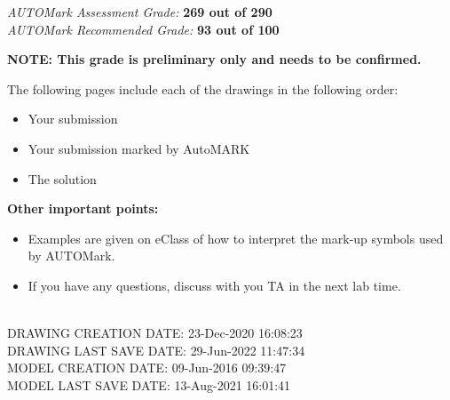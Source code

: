 \documentclass{article}
\begin{document}
\begin{center}
 \large \emph {{AUTOMark Assessment Grade:}}
 \large \textbf{269 out of 290}\\[0.5 cm] %
 \large \emph {{AUTOMark Recommended Grade:}}
 \large \textbf{93 out of 100}\\[0.5 cm] %
\end{center}
\vspace{1.0\baselineskip} %
\begin{flushleft}
\textbf{NOTE: This grade is preliminary only and needs to be confirmed.}\\[1.0 cm] %
\end{flushleft}
The following pages include each of the drawings in the following order:
\begin{itemize}
\itemsep0em %
	\item Your submission 
	\item Your submission marked by AutoMARK
	\item The solution
\end{itemize}
%
\textbf{Other important points:}
\begin{itemize}
\itemsep0em %
	\item Examples are given on eClass of how to interpret the mark-up symbols used by AUTOMark.
	\item If you have any questions, discuss with you TA in the next lab time.
\end{itemize}

\begin{flushleft} \large
\\[0.5cm]
DRAWING CREATION DATE: {23-Dec-2020 16:08:23}\\
DRAWING LAST SAVE DATE: {29-Jun-2022 11:47:34}\\
MODEL CREATION DATE: {09-Jun-2016 09:39:47}\\
MODEL LAST SAVE DATE: {13-Aug-2021 16:01:41}\\
\end{flushleft}
\end{document}
